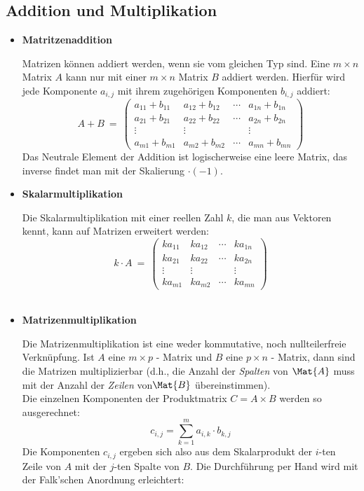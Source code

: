 \documentclass[main.tex]{subfiles}
\begin{document}
\subsection{Addition und Multiplikation}

\begin{itemize}

\item{\textbf{Matritzenaddition}}

Matrizen können addiert werden, wenn sie vom gleichen Typ sind. Eine $m\times n$ Matrix $A$ kann nur mit einer $m\times n$ Matrix $B$ addiert werden. Hierfür wird jede Komponente $a_{i,j}$ mit ihrem zugehörigen Komponenten $b_{i,j}$ addiert:
$$A + B \ = \  \left(
    \begin{array}{cccc}
        a_{11}+ b_{11} & a_{12}+ b_{12} &
            \cdots & a_{1n}+ b_{1n} \\
        a_{21}+ b_{21} & a_{22}+ b_{22} &
            \cdots & a_{2n}+ b_{2n} \\
        \vdots & \vdots &  & \vdots \\
        a_{m1}+ b_{m1} & a_{m2}+ b_{m2} &
            \cdots & a_{mn}+ b_{mn}
    \end{array}
    \right)$$
Das Neutrale Element der Addition ist logischerweise eine leere Matrix, das inverse findet man mit der Skalierung $\cdot (-1)$.\\

\item{\textbf{Skalarmultiplikation}}

Die Skalarmultiplikation mit einer reellen Zahl $k$, die man aus Vektoren kennt, kann auf Matrizen erweitert werden:
$$k\cdot A \ = \ \left(
    \begin{array}{cccc}
        k a_{11} & k a_{12} & \cdots & k a_{1n} \\
        k a_{21} & k a_{22} & \cdots & k a_{2n} \\
        \vdots & \vdots &  & \vdots \\
        k a_{m1} & k a_{m2} & \cdots & k a_{mn}
    \end{array}
    \right) $$\\

\item{\textbf{Matrizenmultiplikation}}

Die Matrizenmultiplikation ist eine weder kommutative, noch nullteilerfreie Verknüpfung. Ist $A$ eine $m\times p$ - Matrix und $B$ eine $p\times n$ - Matrix, dann sind die Matrizen multiplizierbar (d.h., die Anzahl der \textit{Spalten}
von $\Mat{A}$ muss mit der Anzahl der \textit{Zeilen} von$\Mat{B}$ übereinstimmen).\\
Die einzelnen Komponenten der Produktmatrix $C = A \times B$ werden so ausgerechnet:
  $$c_{i,j} = \sum_{k=1}^{m} a_{i,k} \cdot b_{k,j}$$
Die Komponenten $c_{i,j}$ ergeben sich also aus dem Skalarprodukt der $i$-ten Zeile von $A$ mit der $j$-ten Spalte von $B$. Die Durchführung per Hand wird mit der Falk'schen Anordnung erleichtert:


\end{itemize}
\end{document}
